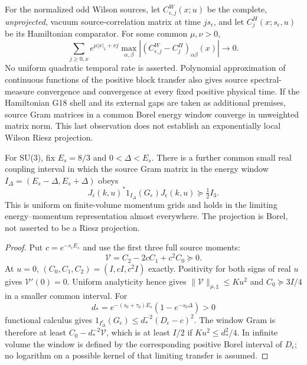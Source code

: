 For the normalized odd Wilson sources, let $C_{\epsilon,j}^W(x;u)$
be the complete, \emph{unprojected}, vacuum source-correlation matrix at
time $j s_\epsilon$, and let $C_j^H(x;s_\epsilon,u)$ be its Hamiltonian
comparator. For some common $\mu,\nu>0$,
\begin{equation}
 \sum_{j\ge0,x}e^{\mu|x|_1+\nu j}
 \max_{\alpha,\beta}|(C_{\epsilon,j}^W-C_j^H)_{\alpha\beta}(x)|\to0.
 \label{eq:wdt-full-correlation-matching}
\end{equation}
No uniform quadratic temporal rate is asserted. Polynomial approximation
of continuous functions of the positive block transfer also gives source
spectral-measure convergence and convergence at every fixed positive
physical time. If the Hamiltonian G18 shell and its external gaps are taken
as additional premises, source Gram matrices in a common Borel energy
window converge in unweighted matrix norm. This last observation does not
establish an exponentially local Wilson Riesz projection.

\begin{theorem}
\label{thm:wdt-visible-window}
For SU(3), fix $E_s=8/3$ and $0<\Delta<E_s$. There is a further common
small real coupling interval in which the source Gram matrix in the energy
window $I_\Delta=(E_s-\Delta,E_s+\Delta)$ obeys
\[
 J_\epsilon(k,u)^*1_{I_\Delta}(G_\epsilon)J_\epsilon(k,u)
 \succeq \tfrac12 I_3.
\]
This is uniform on finite-volume momentum grids and holds in the limiting
energy--momentum representation almost everywhere. The projection is Borel,
not asserted to be a Riesz projection.
\end{theorem}
\begin{proof}
Put $c=e^{-s_\epsilon E_s}$ and use the first three full source moments:
\[
 \mathcal V=C_2-2cC_1+c^2C_0\succeq0.
\]
At $u=0$, $(C_0,C_1,C_2)=(I,cI,c^2I)$ exactly. Positivity for both signs
of real $u$ gives $\mathcal V'(0)=0$. Uniform analyticity hence gives
$\|\mathcal V\|_{\mu,\sharp}\le Ku^2$ and $C_0\succeq3I/4$
in a smaller common interval. For
\[
 d_*=e^{-(s_0+\tau_0)E_s}(1-e^{-s_0\Delta})>0
\]
functional calculus gives
$1_{I_\Delta^c}(G_\epsilon)\le d_*^{-2}(D_\epsilon-c)^2$.
The window Gram is therefore at least $C_0-d_*^{-2}\mathcal V$, which
is at least $I/2$ if $Ku^2\le d_*^2/4$.
In infinite volume the window is defined by the corresponding positive
Borel interval of $D_\epsilon$; no logarithm on a possible kernel of that
limiting transfer is assumed.
\end{proof}


